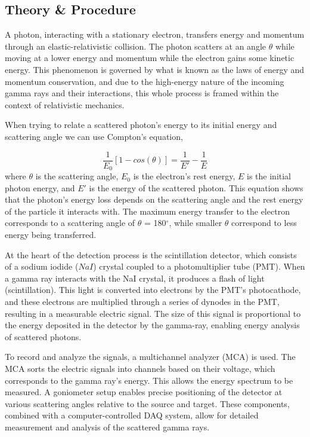 \documentclass[a4paper,12pt,english]{all-in-one} %
\begin{document}
\begin{multicols}{2}

\section*{Theory \& Procedure}
{
A photon, interacting with a stationary electron, transfers energy and momentum through an elastic-relativistic collision. The photon scatters at an angle $\theta$ while moving at a lower energy and momentum while the electron gains some kinetic energy. This phenomenon is governed by what is known as the laws of energy and momentum conservation, and due to the high-energy nature of the incoming gamma rays and their interactions, this whole process is framed within the context of relativistic mechanics.

When trying to relate a scattered photon's energy to its initial energy and scattering angle we can use  Compton's equation,

\begin{equation}
    \frac{1}{E_0}[1-cos(\theta)] = \frac{1}{E'} - \frac{1}{E}
\end{equation}
where $\theta$ is the scattering angle, $E_0$ is the electron's rest energy, $E$ is the initial photon energy, and $E'$ is the energy of the scattered photon. This equation shows that the photon's energy loss depends on the scattering angle and the rest energy of the particle it interacts with. The maximum energy transfer to the electron corresponds to a scattering angle of $\theta$ = 180$^\circ$, while smaller $\theta$ correspond to less energy being transferred.

At the heart of the detection process is the scintillation detector, which consists of a sodium iodide ($NaI$) crystal coupled to a photomultiplier tube (PMT). When a gamma ray interacts with the NaI crystal, it produces a flash of light (scintillation). This light is converted into electrons by the PMT’s photocathode, and these electrons are multiplied through a series of dynodes in the PMT, resulting in a measurable electric signal. The size of this signal is proportional to the energy deposited in the detector by the gamma-ray, enabling energy analysis of scattered photons.

To record and analyze the signals, a multichannel analyzer (MCA) is used. The MCA sorts the electric signals into channels based on their voltage, which corresponds to the gamma ray’s energy. This allows the energy spectrum to be measured. A goniometer setup enables precise positioning of the detector at various scattering angles relative to the source and target. These components, combined with a computer-controlled DAQ system, allow for detailed measurement and analysis of the scattered gamma rays.

}
\end{multicols}
\end{document}
